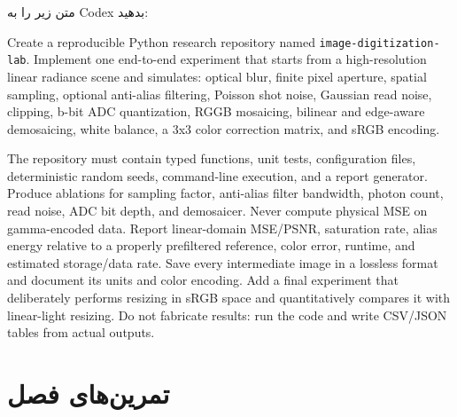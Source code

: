 \documentclass[12pt,openany,oneside]{book}
\begin{document}
\begin{workshopbox}
متن زیر را به Codex بدهید:

\begin{LTR}
\small
Create a reproducible Python research repository named
\texttt{image-digitization-lab}. Implement one end-to-end experiment that starts from a
high-resolution linear radiance scene and simulates: optical blur, finite pixel aperture,
spatial sampling, optional anti-alias filtering, Poisson shot noise, Gaussian read noise,
clipping, b-bit ADC quantization, RGGB mosaicing, bilinear and edge-aware demosaicing,
white balance, a 3x3 color correction matrix, and sRGB encoding.

The repository must contain typed functions, unit tests, configuration files, deterministic
random seeds, command-line execution, and a report generator. Produce ablations for sampling
factor, anti-alias filter bandwidth, photon count, read noise, ADC bit depth, and demosaicer.
Never compute physical MSE on gamma-encoded data. Report linear-domain MSE/PSNR, saturation
rate, alias energy relative to a properly prefiltered reference, color error, runtime, and
estimated storage/data rate. Save every intermediate image in a lossless format and document
its units and color encoding. Add a final experiment that deliberately performs resizing in
sRGB space and quantitatively compares it with linear-light resizing. Do not fabricate results:
run the code and write CSV/JSON tables from actual outputs.
\end{LTR}
\end{workshopbox}

\section{تمرین‌های فصل}
\end{document}
